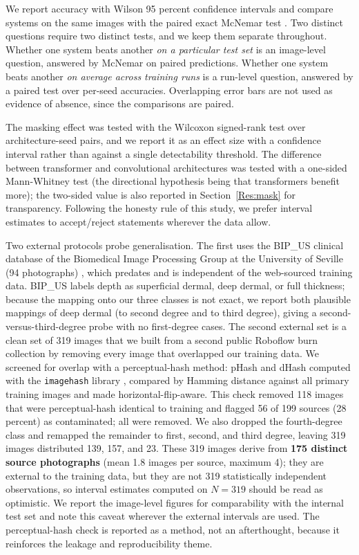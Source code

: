 \documentclass{elektr}
\begin{document}
We report accuracy with Wilson 95 percent confidence intervals \cite{wilson} and compare systems on the same images with the paired exact McNemar test \cite{mcnemar}. Two distinct questions require two distinct tests, and we keep them separate throughout. Whether one system beats another \emph{on a particular test set} is an image-level question, answered by McNemar on paired predictions. Whether one system beats another \emph{on average across training runs} is a run-level question, answered by a paired test over per-seed accuracies. Overlapping error bars are not used as evidence of absence, since the comparisons are paired.

The masking effect was tested with the Wilcoxon signed-rank test over architecture-seed pairs, and we report it as an effect size with a confidence interval rather than against a single detectability threshold. The difference between transformer and convolutional architectures was tested with a one-sided Mann-Whitney test (the directional hypothesis being that transformers benefit more); the two-sided value is also reported in Section~\ref{Res:mask} for transparency. Following the honesty rule of this study, we prefer interval estimates to accept/reject statements wherever the data allow.

Two external protocols probe generalisation. The first uses the BIP\_US clinical database of the Biomedical Image Processing Group at the University of Seville (94 photographs) \cite{acha,rostami}, which predates and is independent of the web-sourced training data. BIP\_US labels depth as superficial dermal, deep dermal, or full thickness; because the mapping onto our three classes is not exact, we report both plausible mappings of deep dermal (to second degree and to third degree), giving a second-versus-third-degree probe with no first-degree cases. The second external set is a clean set of 319 images that we built from a second public Roboflow burn collection by removing every image that overlapped our training data. We screened for overlap with a perceptual-hash method: pHash and dHash computed with the \texttt{imagehash} library \cite{zauner}, compared by Hamming distance against all primary training images and made horizontal-flip-aware. This check removed 118 images that were perceptual-hash identical to training and flagged 56 of 199 sources (28 percent) as contaminated; all were removed. We also dropped the fourth-degree class and remapped the remainder to first, second, and third degree, leaving 319 images distributed 139, 157, and 23. These 319 images derive from \textbf{175 distinct source photographs} (mean 1.8 images per source, maximum 4); they are external to the training data, but they are not 319 statistically independent observations, so interval estimates computed on $N=319$ should be read as optimistic. We report the image-level figures for comparability with the internal test set and note this caveat wherever the external intervals are used. The perceptual-hash check is reported as a method, not an afterthought, because it reinforces the leakage and reproducibility theme.
\end{document}
